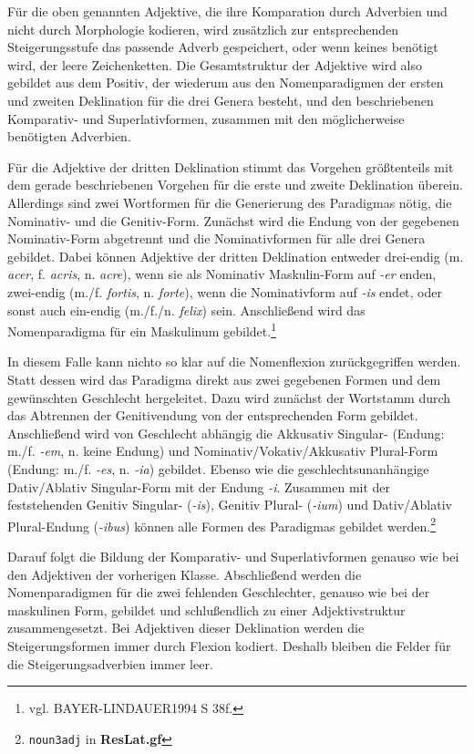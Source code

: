 \documentclass[12pt,abstract=on,titlepage,bibliography=totoc,ngerman,listof=totoc]{scrreprt}
\begin{document}
Für die oben genannten Adjektive, die ihre Komparation durch Adverbien und nicht durch Morphologie kodieren, wird zusätzlich zur entsprechenden Steigerungsstufe das passende Adverb gespeichert, oder wenn keines benötigt wird, der leere Zeichenketten. Die Gesamtstruktur der Adjektive wird also gebildet aus dem Positiv, der wiederum aus den Nomenparadigmen der ersten und zweiten Deklination für die drei Genera besteht, und den beschriebenen Komparativ- und Superlativformen, zusammen mit den möglicherweise benötigten Adverbien.\par
Für die Adjektive der dritten Deklination stimmt das Vorgehen größtenteils mit dem gerade beschriebenen Vorgehen für die erste und zweite Deklination überein. Allerdings sind zwei Wortformen für die Generierung des Paradigmas nötig, die Nominativ- und die Genitiv-Form. Zunächst wird die Endung von der gegebenen Nominativ-Form abgetrennt und die Nominativformen für alle drei Genera gebildet. Dabei können Adjektive der dritten Deklination entweder drei-endig (m. \textit{acer}, f. \textit{acris}, n. \textit{acre}), wenn sie als Nominativ Maskulin-Form auf \textit{-er} enden, zwei-endig (m./f. \textit{fortis}, n. \textit{forte}), wenn die Nominativform auf \textit{-is} endet, oder sonst auch ein-endig (m./f./n. \textit{felix}) sein. Anschließend wird das Nomenparadigma für ein Maskulinum gebildet.\footnote{vgl. BAYER-LINDAUER1994 S 38f.} \par
In diesem Falle kann nichto so klar auf die Nomenflexion zurückgegriffen werden. Statt dessen wird das Paradigma direkt aus zwei gegebenen Formen und dem gewünschten Geschlecht hergeleitet. Dazu wird zunächst der Wortstamm durch das Abtrennen der Genitivendung von der entsprechenden Form gebildet. Anschließend wird von Geschlecht abhängig die Akkusativ Singular- (Endung: m./f. \textit{-em}, n. keine Endung) und Nominativ/Vokativ/Akkusativ Plural-Form (Endung: m./f. \textit{-es}, n. \textit{-ia}) gebildet. Ebenso wie die geschlechtsunanhängige Dativ/Ablativ Singular-Form mit der Endung \textit{-i}. Zusammen mit der feststehenden Genitiv Singular- (\textit{-is}), Genitiv Plural- (\textit{-ium}) und Dativ/Ablativ Plural-Endung (\textit{-ibus}) können alle Formen des Paradigmas gebildet werden.\footnote{\texttt{noun3adj} in \textbf{ResLat.gf}} \par
Darauf folgt die Bildung der Komparativ- und Superlativformen genauso wie bei den Adjektiven der vorherigen Klasse. Abschließend werden die Nomenparadigmen für die zwei fehlenden Geschlechter, genauso wie bei der maskulinen Form, gebildet und schlußendlich zu einer Adjektivstruktur zusammengesetzt. Bei Adjektiven dieser Deklination werden die Steigerungsformen immer durch Flexion kodiert. Deshalb bleiben die Felder für die Steigerungsadverbien immer leer.
\end{document}
